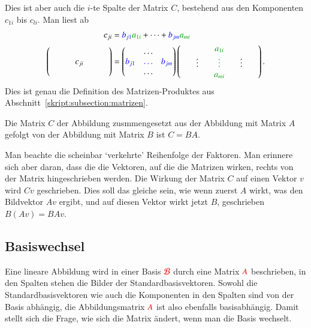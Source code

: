 Dies ist aber auch die $i$-te Spalte der Matrix $C$, bestehend aus den
Komponenten $c_{1i}$ bis $c_{li}$.
Man liest ab
{
\begin{align*}
c_{ji}
&=
{\color{blue}b_{j1}}{\color{darkgreen}a_{1i}} + \dots
	+ {\color{blue}b_{jm}}{\color{darkgreen}a_{mi}}
\\
\begin{pmatrix}
\qquad&\quad&\qquad\\
\phantom{x}&c_{ji}&\phantom{x}\\
\qquad&\quad&\qquad\\
\end{pmatrix}
&=
\begin{pmatrix}
&\dots&\\
\color{blue}b_{j1}&\color{blue}\dots&\color{blue}b_{jm}\\
&\dots&
\end{pmatrix}
\begin{pmatrix}
&\qquad&\color{darkgreen}a_{1i}&\qquad&\\
&\vdots&\color{darkgreen}\vdots&\vdots&\\
&     &\color{darkgreen}a_{mi}&&
\end{pmatrix}.
\end{align*}
}
Dies ist genau die Definition des Matrizen-Produktes aus
Abschnitt~\ref{skript:subsection:matrizen}.

\begin{satz}
Die Matrix $C$ der Abbildung zusmmengesetzt aus der Abbildung
mit Matrix $A$ gefolgt von der Abbildung mit Matrix $B$ ist
$C=BA$.
\end{satz}

Man beachte die scheinbar `verkehrte' Reihenfolge der Faktoren.
Man erinnere sich aber daran, dass die die Vektoren, auf die die Matrizen
wirken, rechts von der Matrix hingeschrieben werden.
Die Wirkung der Matrix $C$ auf einen Vektor $v$ wird $Cv$ geschrieben.
Dies soll das gleiche sein, wie wenn zuerst $A$ wirkt, was den Bildvektor
$Av$ ergibt, und auf diesen Vektor wirkt jetzt $B$, geschrieben $B(Av)=BAv$.

%
%
\subsection{Basiswechsel}
Eine lineare Abbildung wird in einer Basis $\color{red}\mathcal{B}$ durch
eine Matrix $\color{red}A$ beschrieben, in den Spalten stehen die Bilder
der Standardbasisvektoren.
Sowohl die Standardbasisvektoren wie auch die Komponenten in den
Spalten sind von der Basis abhängig, die Abbildungsmatrix $\color{red}A$
ist also ebenfalls basisabhängig.
Damit stellt sich die Frage, wie sich die Matrix ändert, wenn
man die Basis wechselt.

